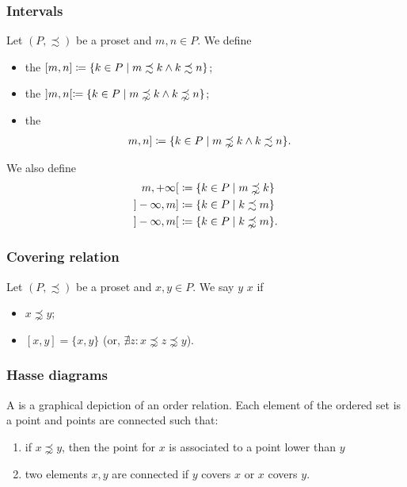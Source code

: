 \subsubsection{Intervals}
\begin{definition}
Let $(P,\precsim)$ be a proset and $m,n\in P$. We define
\begin{itemize}
\item the  $[m,n] \coloneqq \{k\in P\;|\; m\precsim k \land k\precsim n\}$;
\item the  $]m,n[ \coloneqq \{k\in P\;|\; m \precnsim k \land k \precnsim n\}$;
\item the 
\begin{align*}
[m,n[ &\defeq \{k\in P\;|\; m \precsim k \land k \precnsim n\}; \\
]m,n] &\defeq \{k\in P\;|\; m \precnsim k \land k \precsim n\}.
\end{align*}
\end{itemize}
\end{definition}

We also define
\begin{align*}
[m, +\infty[ &\defeq \{k\in P\;|\; m \precsim k\} \\
]m, +\infty[ &\defeq \{k\in P\;|\; m \precnsim k\} \\
]-\infty, m] &\defeq \{k\in P\;|\; k \precsim m\} \\
]-\infty, m[ &\defeq \{k\in P\;|\; k \precnsim m\}.
\end{align*}


\subsubsection{Covering relation}
\begin{definition}
Let $(P,\precsim)$ be a proset and $x,y\in P$. We say $y$  $x$ if
\begin{itemize}
\item $x\precnsim y$;
\item $[x,y] = \{x,y\}$ (or, $\nexists z: x\precnsim z \precnsim y$).
\end{itemize}
\end{definition}
\subsubsection{Hasse diagrams}
A  is a graphical depiction of an order relation. Each element of the ordered set is a point and points are connected such that:
\begin{enumerate}
\item if $x \precnsim y$, then the point for $x$ is associated to a point lower than $y$
\item two elements $x,y$ are connected if $y$ covers $x$ or $x$ covers $y$.
\end{enumerate}

